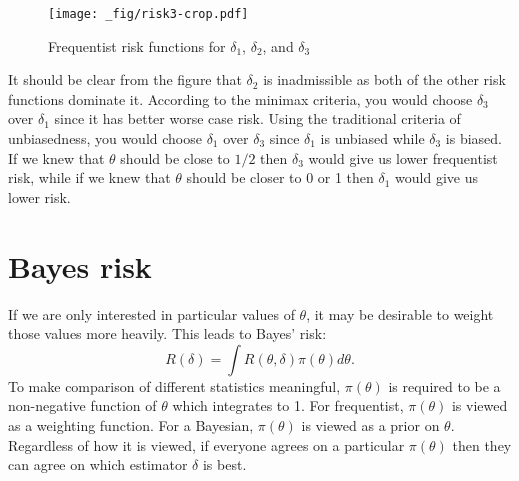 \documentclass[twoside]{article}
\begin{document}
\begin{figure}[ht]
\centering
\texttt{[image: \_fig/risk3-crop.pdf]}
\caption{Frequentist risk functions for $\delta_1$, $\delta_2$, and $\delta_3$}
\label{fig:figure3}
\end{figure}

It should be clear from the figure that $\delta_2$ is inadmissible as both
of the other risk functions dominate it.  According to the minimax criteria,
you would choose $\delta_3$ over $\delta_1$ since it has better worse case
risk.  Using the traditional criteria of unbiasedness, you would choose
$\delta_1$ over $\delta_3$ since $\delta_1$ is unbiased while $\delta_3$ is
biased.  If we knew that $\theta$ should be close to $1/2$ then $\delta_3$
would give us lower frequentist risk, while if we knew that $\theta$ should
be closer to 0 or 1 then $\delta_1$ would give us lower risk.

\section{Bayes risk}

If we are only interested in particular values of $\theta$, it may be desirable
to weight those values more heavily.  This leads to Bayes' risk:
\begin{equation}
R(\delta) = \int R(\theta, \delta) \pi(\theta) d\theta.
\end{equation}
To make comparison of different statistics meaningful, $\pi(\theta)$ is
required to be a non-negative function of $\theta$ which integrates to 1.  For
frequentist, $\pi(\theta)$ is viewed as a weighting function.  For a Bayesian,
$\pi(\theta)$ is viewed as a prior on $\theta$. Regardless of how it is viewed,
if everyone agrees on a particular $\pi(\theta)$ then they can agree on
which estimator $\delta$ is best.



\end{document}
